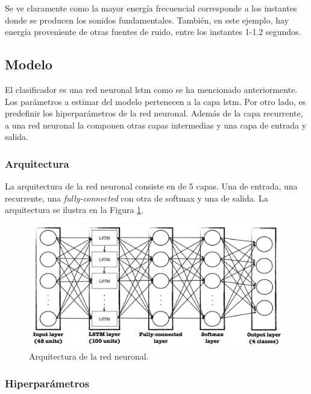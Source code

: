 \indent Se ve claramente como la mayor energía frecuencial corresponde a los instantes donde se producen los sonidos fundamentales. También, en este ejemplo, hay energía proveniente de otras fuentes de ruido, entre los instantes 1-1.2 segundos.

\subsection{Modelo}  

\indent El clasificador es una red neuronal \acrshort{lstm} como se ha mencionado anteriormente. Los parámetros a estimar del modelo pertenecen a la capa \acrshort{lstm}. Por otro lado, es predefinir los hiperparámetros de la red neuronal. Además de la capa recurrente, a una red neuronal la componen otras capas intermedias y una capa de entrada y salida.

\subsubsection{Arquitectura}

\indent La arquitectura de la red neuronal consiste en de 5 capas. Una de entrada, una recurrente, una \textit{fully-connected} con otra de softmax y una de salida. La arquitectura se ilustra en la Figura \ref{fig:nn-architecture}.

\begin{figure}[H]
    \centering
    \includegraphics[scale=0.35]{sections/chapter-07/images/lstm-architecture.png}
    \caption[Arquitectura de la red neuronal]{Arquitectura de la red neuronal.}
    \label{fig:nn-architecture}
\end{figure}

\subsubsection{Hiperparámetros}

